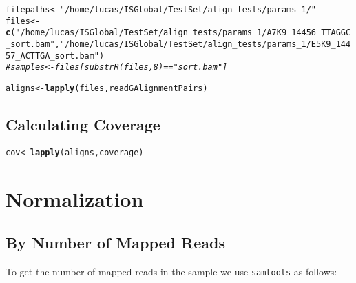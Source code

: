 \documentclass{article}\usepackage[]{graphicx}\usepackage[]{color}
\makeatletter
\newcommand{\hlstr}[1]{\textcolor[rgb]{0.192,0.494,0.8}{#1}}%
\newcommand{\hlcom}[1]{\textcolor[rgb]{0.678,0.584,0.686}{\textit{#1}}}%
\newcommand{\hlstd}[1]{\textcolor[rgb]{0.345,0.345,0.345}{#1}}%
\newcommand{\hlkwb}[1]{\textcolor[rgb]{0.69,0.353,0.396}{#1}}%
\newcommand{\hlkwd}[1]{\textcolor[rgb]{0.737,0.353,0.396}{\textbf{#1}}}%
\newenvironment{kframe}{%
 \def\at@end@of@kframe{}%
 \ifinner\ifhmode%
  \def\at@end@of@kframe{\end{minipage}}%
  \begin{minipage}{\columnwidth}%
 \fi\fi%
 \def\FrameCommand##1{\hskip\@totalleftmargin \hskip-\fboxsep
 \colorbox{shadecolor}{##1}\hskip-\fboxsep
     \hskip-\linewidth \hskip-\@totalleftmargin \hskip\columnwidth}%
 \MakeFramed {\advance\hsize-\width
   \@totalleftmargin\z@ \linewidth\hsize
   \@setminipage}}%
 {\par\unskip\endMakeFramed%
 \at@end@of@kframe}
\newenvironment{knitrout}{}{} %
\makeatother
\begin{document}
\begin{knitrout}
\color{fgcolor}\begin{kframe}
\begin{alltt}
\hlstd{filepaths} \hlkwb{<-} \hlstr{"/home/lucas/ISGlobal/TestSet/align_tests/params_1/"}
\hlstd{files} \hlkwb{<-} \hlkwd{c}\hlstd{(}\hlstr{"/home/lucas/ISGlobal/TestSet/align_tests/params_1/A7K9_14456_TTAGGC_sort.bam"}\hlstd{,} \hlstr{"/home/lucas/ISGlobal/TestSet/align_tests/params_1/E5K9_14457_ACTTGA_sort.bam"}\hlstd{)}
\hlcom{#samples <- files[substrR(files, 8) == "sort.bam"]}

\hlstd{aligns} \hlkwb{<-} \hlkwd{lapply}\hlstd{(files, readGAlignmentPairs)}
\end{alltt}
\end{kframe}
\end{knitrout}

\subsection{Calculating Coverage}
\begin{knitrout}
\color{fgcolor}\begin{kframe}
\begin{alltt}
\hlstd{cov} \hlkwb{<-} \hlkwd{lapply}\hlstd{(aligns, coverage)}
\end{alltt}
\end{kframe}
\end{knitrout}

\section{Normalization}%

\subsection{By Number of Mapped Reads} %

\noindent To get the number of mapped reads in the sample we use \texttt{samtools} as follows:
\end{document}
